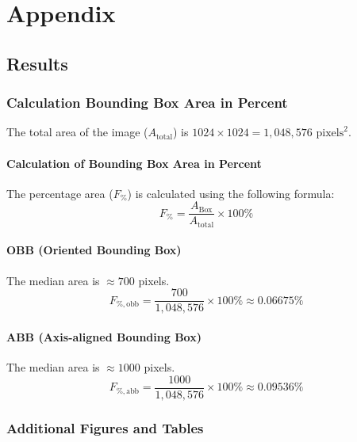 \chapter{Appendix}



\section{Results}
\subsection{Calculation Bounding Box Area in Percent}
\label{ap:calc_bb_area_percent}

The total area of the image ($A_{\text{total}}$) is $1024 \times 1024 = 1,048,576 \text{ pixels}^2$.

\subsubsection*{Calculation of Bounding Box Area in Percent}
The percentage area ($F_{\%}$) is calculated using the following formula:
$$F_{\%} = \frac{A_{\text{Box}}}{A_{\text{total}}} \times 100\%$$

\subsubsection*{OBB (Oriented Bounding Box)}
The median area is $\approx 700$ pixels.
$$F_{\%,\text{obb}} = \frac{700}{1,048,576} \times 100\% \approx 0.06675\%$$

\subsubsection*{ABB (Axis-aligned Bounding Box)}
The median area is $\approx 1000$ pixels.
$$F_{\%,\text{abb}} = \frac{1000}{1,048,576} \times 100\% \approx 0.09536\%$$

\FloatBarrier
\clearpage

\subsection{Additional Figures and Tables}


